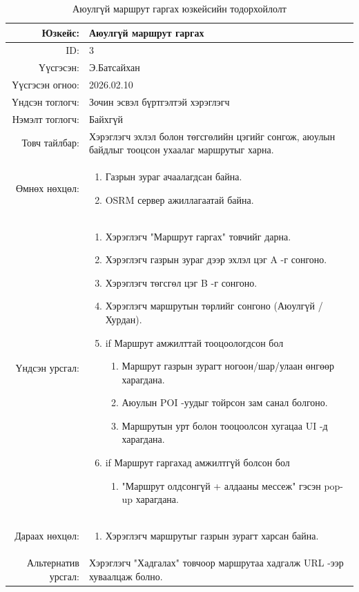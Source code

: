 \begin{longtable}{|r|p{11.5cm}|}
    \caption{Аюулгүй маршрут гаргах юзкейсийн тодорхойлолт}
	\label{table:usecase3}\\ \hline
	{Юзкейс:} & {Аюулгүй маршрут гаргах}\\ \hline
	{ID:} & {3}\\ \hline
	{Үүсгэсэн:} & {Э.Батсайхан}\\ \hline
	{Үүсгэсэн огноо:} & {2026.02.10}\\ \hline
	{Үндсэн тоглогч:} & {Зочин эсвэл бүртгэлтэй хэрэглэгч}\\ \hline
	{Нэмэлт тоглогч:} & {Байхгүй}\\ \hline
	{Товч тайлбар:} & {Хэрэглэгч эхлэл болон төгсгөлийн цэгийг сонгож, аюулын байдлыг тооцсон ухаалаг маршрутыг харна.}\\ \hline
	{Өмнөх нөхцөл:} & {\begin{enumerate}[nosep]
	    \item Газрын зураг ачаалагдсан байна.
        \item OSRM сервер ажиллагаатай байна.
	\end{enumerate}}\\ \hline
	{Үндсэн урсгал:} & {
	\begin{enumerate}[nosep]
	    \item Хэрэглэгч "Маршрут гаргах" товчийг дарна.
	    \item Хэрэглэгч газрын зураг дээр эхлэл цэг A -г сонгоно.
        \item Хэрэглэгч төгсгөл цэг B -г сонгоно.
	    \item Хэрэглэгч маршрутын төрлийг сонгоно (Аюулгүй / Хурдан).
	    \item if Маршрут амжилттай тооцоологдсон бол
	        \begin{enumerate}[nosep,label*=\arabic*.]
	            \item Маршрут газрын зурагт ногоон/шар/улаан өнгөөр харагдана.
                \item Аюулын POI -уудыг тойрсон зам санал болгоно.
                \item Маршрутын урт болон тооцоолсон хугацаа UI -д харагдана.
	        \end{enumerate}
	    \item if Маршрут гаргахад амжилтгүй болсон бол
                \begin{enumerate}[nosep,label*=\arabic*.]
	        \item "Маршрут олдсонгүй + алдааны мессеж" гэсэн pop-up харагдана.
	    \end{enumerate}
	\end{enumerate}}\\ \hline
	{Дараах нөхцөл:} & {\begin{enumerate}
	    \item Хэрэглэгч маршрутыг газрын зурагт харсан байна.
	\end{enumerate}}\\ \hline
	{Альтернатив урсгал:} & {Хэрэглэгч "Хадгалах" товчоор маршрутаа хадгалж URL -ээр хуваалцаж болно.}\\ \hline
\end{longtable}


